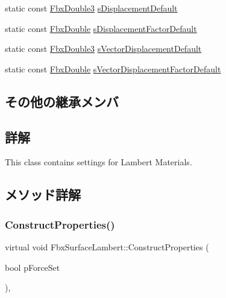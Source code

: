 \begin{DoxyCompactItemize}
\item 
static const \hyperlink{fbxtypes_8h_ae0a96f14cde566774c7553aa7523b7a7}{Fbx\+Double3} \hyperlink{class_fbx_surface_lambert_aa196761f2af76faff4513ca720918413}{s\+Displacement\+Default}
\item 
static const \hyperlink{fbxtypes_8h_a171e72a1c46fc15c1a6c9c31948c1c5b}{Fbx\+Double} \hyperlink{class_fbx_surface_lambert_aeb59fa42db9bb880fa1b57a1df8d68b2}{s\+Displacement\+Factor\+Default}
\item 
static const \hyperlink{fbxtypes_8h_ae0a96f14cde566774c7553aa7523b7a7}{Fbx\+Double3} \hyperlink{class_fbx_surface_lambert_a1cf42552e56bb7356da1e4d1a2c96603}{s\+Vector\+Displacement\+Default}
\item 
static const \hyperlink{fbxtypes_8h_a171e72a1c46fc15c1a6c9c31948c1c5b}{Fbx\+Double} \hyperlink{class_fbx_surface_lambert_a76cd8871ef0d347837dde4caf23e6f71}{s\+Vector\+Displacement\+Factor\+Default}
\end{DoxyCompactItemize}
\subsection*{その他の継承メンバ}


\subsection{詳解}
This class contains settings for Lambert Materials. 

\subsection{メソッド詳解}
\mbox{\label{class_fbx_surface_lambert_a6693e1c08050978c78eece2aa48688e9}} 
\subsubsection{\texorpdfstring{Construct\+Properties()}{ConstructProperties()}}
{\footnotesize\ttfamily virtual void Fbx\+Surface\+Lambert\+::\+Construct\+Properties (\begin{DoxyParamCaption}\item[{bool}]{p\+Force\+Set }\end{DoxyParamCaption})\hspace{0.3cm}{\ttfamily [protected]}, {\ttfamily [virtual]}}

